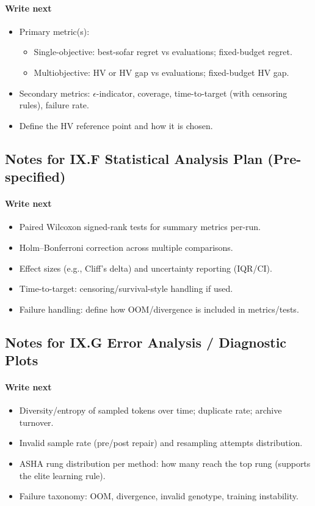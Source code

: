\paragraph{Write next}
\begin{itemize}
  \item Primary metric(s):
  \begin{itemize}
    \item Single-objective: best-sofar regret vs evaluations; fixed-budget regret.
    \item Multiobjective: HV or HV gap vs evaluations; fixed-budget HV gap.
  \end{itemize}
  \item Secondary metrics: $\epsilon$-indicator, coverage, time-to-target (with censoring rules), failure rate.
  \item Define the HV reference point and how it is chosen.
\end{itemize}

\subsection*{Notes for IX.F Statistical Analysis Plan (Pre-specified)}
\paragraph{Write next}
\begin{itemize}
  \item Paired Wilcoxon signed-rank tests for summary metrics per-run.
  \item Holm--Bonferroni correction across multiple comparisons.
  \item Effect sizes (e.g., Cliff’s delta) and uncertainty reporting (IQR/CI).
  \item Time-to-target: censoring/survival-style handling if used.
  \item Failure handling: define how OOM/divergence is included in metrics/tests.
\end{itemize}

\subsection*{Notes for IX.G Error Analysis / Diagnostic Plots}
\paragraph{Write next}
\begin{itemize}
  \item Diversity/entropy of sampled tokens over time; duplicate rate; archive turnover.
  \item Invalid sample rate (pre/post repair) and resampling attempts distribution.
  \item ASHA rung distribution per method: how many reach the top rung (supports the elite learning rule).
  \item Failure taxonomy: OOM, divergence, invalid genotype, training instability.
\end{itemize}

